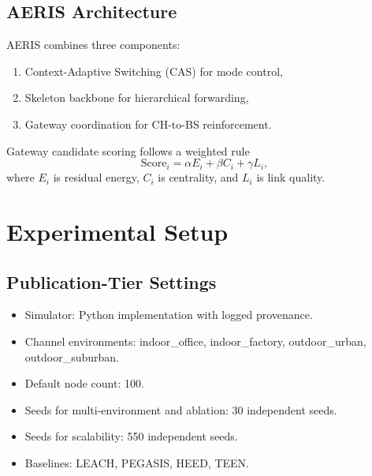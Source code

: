 \documentclass[sensors,article,submit,moreauthors,pdftex]{Definitions/mdpi}
\begin{document}
\subsection{AERIS Architecture}
AERIS combines three components:
\begin{enumerate}
\item Context-Adaptive Switching (CAS) for mode control,
\item Skeleton backbone for hierarchical forwarding,
\item Gateway coordination for CH-to-BS reinforcement.
\end{enumerate}
Gateway candidate scoring follows a weighted rule
\begin{equation}
\mathrm{Score}_i = \alpha E_i + \beta C_i + \gamma L_i,
\end{equation}
where $E_i$ is residual energy, $C_i$ is centrality, and $L_i$ is link quality.

\section{Experimental Setup}
\subsection{Publication-Tier Settings}
\begin{itemize}
\item Simulator: Python implementation with logged provenance.
\item Channel environments: indoor\_office, indoor\_factory, outdoor\_urban, outdoor\_suburban.
\item Default node count: 100.
\item Seeds for multi-environment and ablation: 30 independent seeds.
\item Seeds for scalability: 550 independent seeds.
\item Baselines: LEACH, PEGASIS, HEED, TEEN.
\end{itemize}
\end{document}
